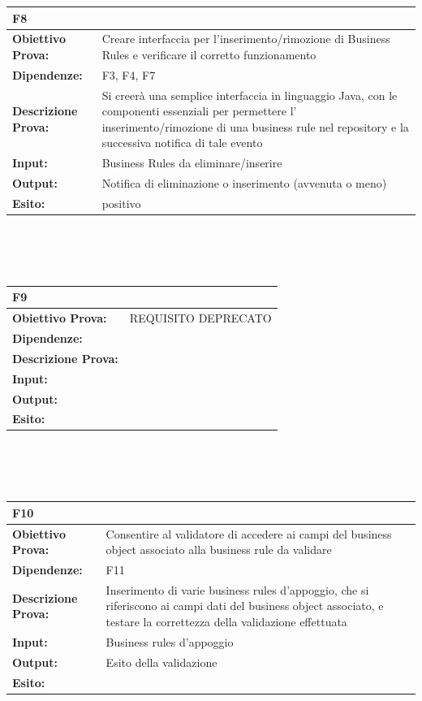 \documentclass[11pt,titlepage,a4paper]{report}
\begin{document}
\begin{tabular}{||p{4.5cm}||p{7.5cm}||}
\hline
\textbf{\textsf{F8}}& \\
\hline
{\textbf {Obiettivo Prova:}}& Creare interfaccia per l'inserimento/rimozione di Business Rules e verificare il corretto funzionamento\\ \hline
{\textbf{Dipendenze:}}& F3, F4, F7 \\ \hline
{\textbf{Descrizione Prova:}}& Si creer\`a  una semplice interfaccia in linguaggio Java, con le componenti essenziali per permettere l' inserimento/rimozione di una business rule nel repository e la successiva notifica di tale evento \\ \hline
{\textbf{Input:}}& Business Rules da eliminare/inserire \\ \hline
{\textbf{Output:}}& Notifica di eliminazione o inserimento (avvenuta o meno) \\ \hline
{\textbf{Esito:}}&  positivo\\ \hline
\end{tabular} \\
\\
\\
\begin{tabular}{||p{4.5cm}||p{7.5cm}||}
\hline
\textbf{\textsf{F9}}& \\
\hline
{\textbf {Obiettivo Prova:}}& REQUISITO DEPRECATO\\ \hline
{\textbf{Dipendenze:}}& \\ \hline
{\textbf{Descrizione Prova:}}& \\ \hline
{\textbf{Input:}}& \\ \hline
{\textbf{Output:}}&  \\ \hline
{\textbf{Esito:}}&  \\ \hline
\end{tabular} \\
\\
\\
\begin{tabular}{||p{4.5cm}||p{7.5cm}||}
\hline
\textbf{\textsf{F10}}& \\
\hline
{\textbf {Obiettivo Prova:}}& Consentire al validatore di accedere ai campi del business object associato alla business rule da validare \\ \hline
{\textbf{Dipendenze:}}& F11\\ \hline
{\textbf{Descrizione Prova:}}&  Inserimento di varie business rules d'appoggio, che si riferiscono ai campi dati del business object associato, e testare la correttezza della validazione effettuata \\ \hline
{\textbf{Input:}}&  Business rules d'appoggio \\ \hline
{\textbf{Output:}}& Esito della validazione \\ \hline
{\textbf{Esito:}}&  \\ \hline
\end{tabular} \\
\end{document}
